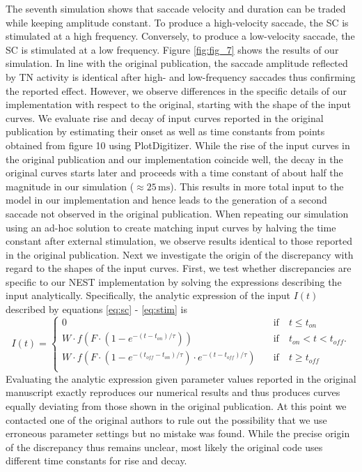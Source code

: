 \documentclass[10pt,a4paper,onecolumn]{article}
\begin{document}
The seventh simulation shows that saccade velocity and duration can be
traded while keeping amplitude constant. To produce a high-velocity
saccade, the SC is stimulated at a high frequency. Conversely, to
produce a low-velocity saccade, the SC is stimulated at a low frequency.
Figure \ref{fig:fig_7} shows the results of our simulation. In line with
the original publication, the saccade amplitude reflected by TN activity
is identical after high- and low-frequency saccades thus confirming the
reported effect. However, we observe differences in the specific details
of our implementation with respect to the original, starting with the
shape of the input curves. We evaluate rise and decay of input curves
reported in the original publication by estimating their onset as well
as time constants from points obtained from figure 10 using
PlotDigitizer. While the rise of the input curves in the original
publication and our implementation coincide well, the decay in the
original curves starts later and proceeds with a time constant of about
half the magnitude in our simulation (\(\approx25\,\mathrm{ms}\)). This
results in more total input to the model in our implementation and hence
leads to the generation of a second saccade not observed in the original
publication. When repeating our simulation using an ad-hoc solution to
create matching input curves by halving the time constant after external
stimulation, we observe results identical to those reported in the
original publication. Next we investigate the origin of the discrepancy
with regard to the shapes of the input curves. First, we test whether
discrepancies are specific to our NEST implementation by solving the
expressions describing the input analytically. Specifically, the
analytic expression of the input \(I(t)\) described by equations
\ref{eq:sc} - \ref{eq:stim} is \begin{equation}
I(t)=
\left\{
\begin{array}{lll}
    0 \quad &\textrm{if} \quad t \leq {t}_{on} \\
    W \cdot f(F \cdot (1-{e}^{-(t-{t}_{on})/ \tau})) \quad &\textrm{if} \quad {t}_{on}<t<{t}_{off} \textrm{.}\\
    W \cdot f(F \cdot (1-{e}^{-({t}_{off}-{t}_{on})/ \tau}) \cdot {e}^{-(t-{t}_{off})/ \tau}) \quad &\textrm{if} \quad t \geq {t}_{off} \\
\end{array}
\right.
\label{eq:analytic}\end{equation} Evaluating the analytic expression
given parameter values reported in the original manuscript exactly
reproduces our numerical results and thus produces curves equally
deviating from those shown in the original publication. At this point we
contacted one of the original authors to rule out the possibility that
we use erroneous parameter settings but no mistake was found. While the
precise origin of the discrepancy thus remains unclear, most likely the
original code uses different time constants for rise and decay.
\end{document}

